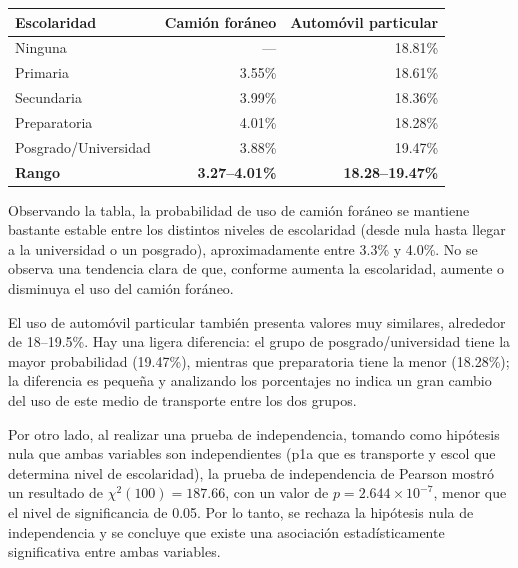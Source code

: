 \documentclass[12pt,a4paper]{article}
\begin{document}
\begin{table}[htbp]
    \centering
    \renewcommand{\arraystretch}{1.5} %
    \begin{tabular}{l r r}
        \toprule
        \textbf{Escolaridad} & \textbf{Camión foráneo} & \textbf{Automóvil particular} \\
        \midrule
        Ninguna               & ---          & 18.81\% \\
        \hline
        Primaria              & 3.55\%       & 18.61\% \\
        \hline
        Secundaria            & 3.99\%       & 18.36\% \\
        \hline
        Preparatoria          & 4.01\%       & 18.28\% \\
        \hline
        Posgrado/Universidad  & 3.88\%       & 19.47\% \\
        \hline
        \textbf{Rango}        & \textbf{3.27--4.01\%} & \textbf{18.28--19.47\%} \\
        \bottomrule
    \end{tabular}
\end{table}

Observando la tabla, la probabilidad de uso de camión foráneo se mantiene bastante estable entre los distintos niveles de escolaridad (desde nula hasta llegar a la universidad o un posgrado), aproximadamente entre 3.3\% y 4.0\%. No se observa una tendencia clara de que, conforme aumenta la escolaridad, aumente o disminuya el uso del camión foráneo.

El uso de automóvil particular también presenta valores muy similares, alrededor de 18--19.5\%. Hay una ligera diferencia: el grupo de posgrado/universidad tiene la mayor probabilidad (19.47\%), mientras que preparatoria tiene la menor (18.28\%); la diferencia es pequeña y analizando los porcentajes no indica un gran cambio del uso de este medio de transporte entre los dos grupos.

Por otro lado, al realizar una prueba de independencia, tomando como hipótesis nula que ambas variables son independientes (p1a que es transporte y escol que determina nivel de escolaridad), la prueba de independencia de Pearson mostró un resultado de $\chi^2(100) = 187.66$, con un valor de $p = 2.644 \times 10^{-7}$, menor que el nivel de significancia de 0.05. Por lo tanto, se rechaza la hipótesis nula de independencia y se concluye que existe una asociación estadísticamente significativa entre ambas variables.
\end{document}

